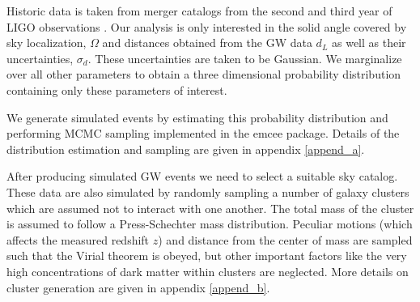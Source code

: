 
Historic data is taken from merger catalogs from the second and third year of LIGO observations \cite{GWTC_2,GWTC_3}. Our analysis is only interested in the solid angle covered by sky localization, $\Omega$ and distances obtained from the GW data $d_L$ as well as their uncertainties, $\sigma_d$. These uncertainties are taken to be Gaussian. We marginalize over all other parameters to obtain a three dimensional probability distribution containing only these parameters of interest.

We generate simulated events by estimating this probability distribution and performing MCMC sampling implemented in the emcee package. Details of the distribution estimation and sampling are given in appendix \ref{append_a}.

After producing simulated GW events we need to select a suitable sky catalog. These data are also simulated by randomly sampling a number of galaxy clusters which are assumed not to interact with one another. The total mass of the cluster is assumed to follow a Press-Schechter mass distribution\cite{Press_1974}. Peculiar motions (which affects the measured redshift $z$) and distance from the center of mass are sampled such that the Virial theorem is obeyed, but other important factors like the very high concentrations of dark matter within clusters are neglected. More details on cluster generation are given in appendix \ref{append_b}.
    


